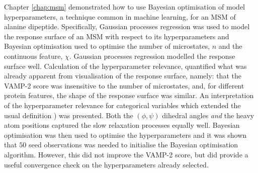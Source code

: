 Chapter \ref{chap:msm} demonstrated how to use Bayesian optimisation of model hyperparameters, a technique common in machine learning, for an MSM of alanine dipeptide. Specifically, Gaussian processes regression was used to model the response surface of an MSM with respect to its hyperparameters and Bayesian optimisation used to optimise the number of microstates, $n$ and the continuous feature, $\chi$. Gaussian processes regression modelled the response surface well. Calculation of the hyperparameter relevance, quantified what was already apparent from visualisation of the response surface, namely: that the VAMP-2 score was insensitive to the number of microstates, and, for different protein features, the shape of the response surface was similar. An interpretation of the hyperparameter relevance for categorical variables which extended the usual definition \cite{bergstrajamesbergstraRandomSearchHyperParameter2012}) was presented. Both the $(\phi, \psi)$ dihedral angles \emph{and} the heavy atom positions captured the slow relaxation processes equally well. Bayesian optimisation was then used to optimise the hyperparameters and it was shown that $50$ seed observations was needed to initialise the Bayesian optimisation algorithm. However, this did not improve the VAMP-2 score, but did provide a useful convergence check on the hyperparameters already selected. 

